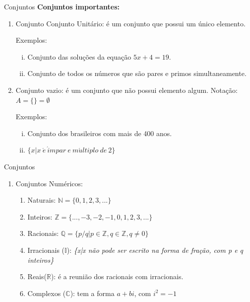 \documentclass[aspectratio=169]{beamer}
\begin{document}
\begin{frame}{Conjuntos}
    \textbf{Conjuntos importantes:}
    \vspace{4mm}

\begin{enumerate}
    \item Conjunto Conjunto Unitário: é um conjunto que possui um único elemento.
 
    \vspace{2mm}
    Exemplos:
    \begin{enumerate}[i)]
        \item Conjunto das soluções da equação $5x + 4 = 19$.
        \item Conjunto de todos os números que são pares e primos simultaneamente.
    \end{enumerate}

    \item Conjunto vazio: é um conjunto que não possui elemento algum. Notação: $A = \{ \} = \emptyset $
    
    \vspace{2mm}
    Exemplos:
    \begin{enumerate}[i)]
        \item Conjunto dos brasileiros com mais de 400 anos.
        \item $\{x|x ~ \acute{e} ~ \acute{i}mpar ~ e ~ m\acute{u}ltiplo ~ de ~ 2\}$
    \end{enumerate}
\end{enumerate}   

\end{frame}

\begin{frame}{Conjuntos}
    \begin{enumerate}[3]
        \item Conjuntos Numéricos:
        
        \begin{enumerate}[a]
            \item Naturais: $\mathbb{N} = \{0,1,2,3, ... \}$
            \item Inteiros: $\mathbb{Z} = \{..., -3,-2,-1,0,1,2,3, ... \}$
            \item Racionais: $\mathbb{Q} = \{p / q | p \in \mathbb{Z}, q \in \mathbb{Z},q \neq 0 \}$
            \item Irracionais ($\mathbb{I}$): \textit{\{x|x não pode ser escrito na forma de fração, com p e q inteiros\}}
            \item Reais($\mathbb{R}$): é a reunião dos racionais com irracionais.
            \item Complexos ($\mathbb{C}$): tem a forma $a + bi$, com $i^2=-1$
        \end{enumerate}
    \end{enumerate}
\end{frame}
\end{document}
